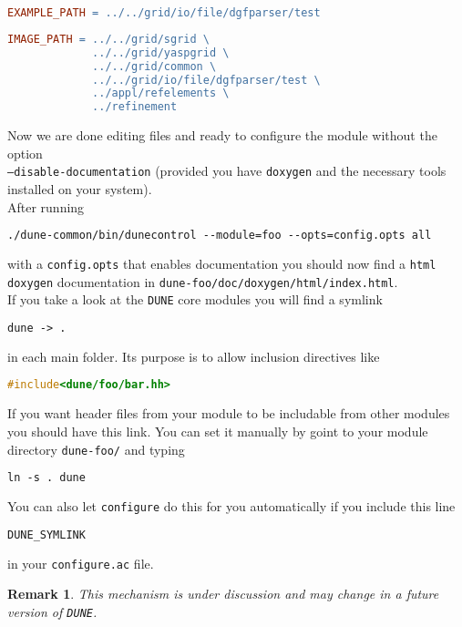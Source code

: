 \documentclass[11pt,a4paper,headinclude,footinclude,DIV16,normalheadings]{scrartcl}
\newtheorem{remark}{Remark}[section]
\newcommand{\dune}{\texttt{DUNE}\xspace}
\newcommand{\configure}{\texttt{configure}\xspace}
\newcommand{\configureac}{\texttt{configure.ac}\xspace}
\begin{document}
\begin{lstlisting}[language=make]
EXAMPLE_PATH = ../../grid/io/file/dgfparser/test 
\end{lstlisting}

\begin{lstlisting}[language=make]
IMAGE_PATH = ../../grid/sgrid \
             ../../grid/yaspgrid \
             ../../grid/common \
             ../../grid/io/file/dgfparser/test \
             ../appl/refelements \
             ../refinement
\end{lstlisting}

Now we are done editing files and ready to configure the module without the
option\\ \texttt{--disable-documentation} (provided you have \texttt{doxygen} and
the necessary tools installed on your system).\\
After running

\begin{lstlisting}[language=make]
./dune-common/bin/dunecontrol --module=foo --opts=config.opts all
\end{lstlisting}
with a \texttt{config.opts} that enables documentation you should now find a
\texttt{html} \texttt{doxygen} documentation in
\texttt{dune-foo/doc/doxygen/html/index.html}.\\

If you take a look at the \dune core modules you will find a symlink
\begin{lstlisting}[language=make]
dune -> .
\end{lstlisting}
in each main folder. Its purpose is to allow inclusion directives like
\begin{lstlisting}[language=c++]
#include<dune/foo/bar.hh>
\end{lstlisting}
If you want header files from your module to be includable from other
modules you should have this link.  You can set it manually
by goint to your module directory \texttt{dune-foo/} and typing
\begin{lstlisting}[language=make]
ln -s . dune
\end{lstlisting}
You can also let \configure do this for you automatically if you include this line 
\begin{lstlisting}[language=make]
DUNE_SYMLINK
\end{lstlisting}
in your \configureac file.

\begin{remark}
 This mechanism is under discussion and may change in a future version of \dune.
\end{remark}
\end{document}
